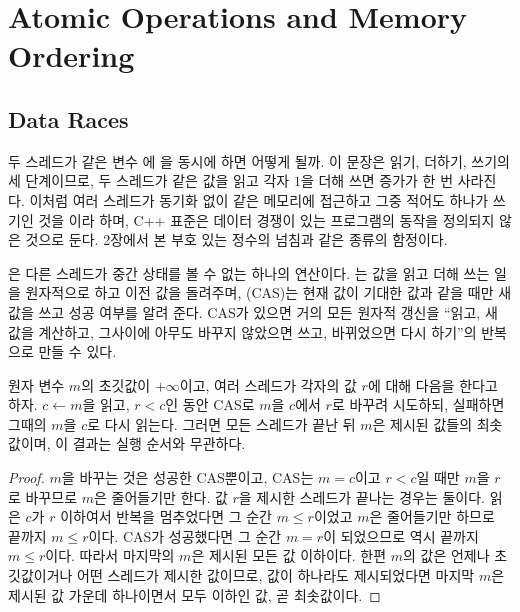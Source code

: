 \section{Atomic Operations and Memory Ordering}
\label{sec:atomics}

\subsection{Data Races}

두 스레드가 같은 변수 에 을 동시에 하면 어떻게 될까. 이 문장은 읽기, 더하기, 쓰기의 세 단계이므로, 두 스레드가 같은 값을 읽고 각자 $1$을 더해 쓰면 증가가 한 번 사라진다. 이처럼 여러 스레드가 동기화 없이 같은 메모리에 접근하고 그중 적어도 하나가 쓰기인 것을 이라 하며, C++ 표준은 데이터 경쟁이 있는 프로그램의 동작을 정의되지 않은 것으로 둔다\cite{iso14882-2020}. 2장에서 본 부호 있는 정수의 넘침과 같은 종류의 함정이다.

은 다른 스레드가 중간 상태를 볼 수 없는 하나의 연산이다. 는 값을 읽고 더해 쓰는 일을 원자적으로 하고 이전 값을 돌려주며, (CAS)는 현재 값이 기대한 값과 같을 때만 새 값을 쓰고 성공 여부를 알려 준다. CAS가 있으면 거의 모든 원자적 갱신을 ``읽고, 새 값을 계산하고, 그사이에 아무도 바꾸지 않았으면 쓰고, 바뀌었으면 다시 하기''의 반복으로 만들 수 있다.

\begin{proposition}
\label{prop:cas-min}
원자 변수 $m$의 초깃값이 $+\infty$이고, 여러 스레드가 각자의 값 $r$에 대해 다음을 한다고 하자. $c\gets m$을 읽고, $r<c$인 동안 CAS로 $m$을 $c$에서 $r$로 바꾸려 시도하되, 실패하면 그때의 $m$을 $c$로 다시 읽는다. 그러면 모든 스레드가 끝난 뒤 $m$은 제시된 값들의 최솟값이며, 이 결과는 실행 순서와 무관하다.
\end{proposition}

\begin{proof}
$m$을 바꾸는 것은 성공한 CAS뿐이고, CAS는 $m=c$이고 $r<c$일 때만 $m$을 $r$로 바꾸므로 $m$은 줄어들기만 한다. 값 $r$을 제시한 스레드가 끝나는 경우는 둘이다. 읽은 $c$가 $r$ 이하여서 반복을 멈추었다면 그 순간 $m\le r$이었고 $m$은 줄어들기만 하므로 끝까지 $m\le r$이다. CAS가 성공했다면 그 순간 $m=r$이 되었으므로 역시 끝까지 $m\le r$이다. 따라서 마지막의 $m$은 제시된 모든 값 이하이다. 한편 $m$의 값은 언제나 초깃값이거나 어떤 스레드가 제시한 값이므로, 값이 하나라도 제시되었다면 마지막 $m$은 제시된 값 가운데 하나이면서 모두 이하인 값, 곧 최솟값이다.
\end{proof}

